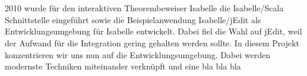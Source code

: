 \section*{\abstractname}

2010 wurde für den interaktiven Theorembeweiser Isabelle die Isabelle/Scala Schnittstelle eingeführt
sowie die Beispielanwendung Isabelle/jEdit als Entwicklungsumgebung für Isabelle entwickelt. Dabei
fiel die Wahl auf jEdit, weil der Aufwand für die Integration gering gehalten werden sollte. In
diesem Projekt konzentrieren wir uns nun auf die Entwicklungsumgebung. Dabei werden modernste
Techniken miteinander verknüpft und eine bla bla bla 
